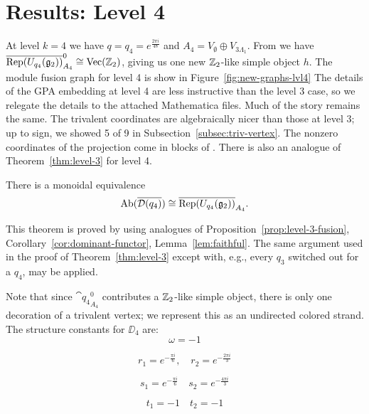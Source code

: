\begin{comment}
    So $B\subseteq A_3$. Since $A_3$ has only two simple summands, we know $A_3$ has no nontrivial subalgebras: $B\cong \unit$ or $B\cong A_3$.
    If $B\cong \unit$ then
    \[
        \Ab(\ol{\DD_3}) \cong \ol{\Rep(U_{q_3}(\gg_2))}_\unit \cong \ol{\Rep(U_{q_3}(\gg_2))}
    \]
    A quick dimension count falsifies this. Hence $\Ab(\ol{\DD_3}) \cong \ol{ \Rep(U_{q_3}(\gg_2))}_{A_3}$.
\end{proof}

\end{comment}






\section{Results: Level 4}\label{sec:results-4}
At level $k=4$ we have $q = q_4 = e^{\frac{2\pi i}{48}}$ and 
$A_4=V_\emptyset \oplus V_{3\Lambda_1}$. 
From \cite{DMNO} we have $\overline{\operatorname{Rep}(U_{q_4}(\mathfrak{g}_2))}_{A_4}^0 \cong \operatorname{Vec}(\mathbb{Z}_2)$, giving us one new 
$\mathbb{Z}_2$-like simple object $h$. 
The module fusion graph for level 4 is show in Figure~\ref{fig:new-graphs-lvl4}
The details of the GPA embedding at level 4 are less instructive than the level 3 case, 
so we relegate the details to the attached Mathematica files. 
Much of the story remains the same. 
The trivalent coordinates are algebraically nicer than those at level 3; 
up to sign, we showed 5 of 9 in Subsection~\ref{subsec:triv-vertex}. 
The nonzero coordinates of the projection come in blocks of . 
There is also an analogue of Theorem~\ref{thm:level-3} for level 4.

\begin{theorem}\label{thm:level-4}
    There is a monoidal equivalence
    \[
        \operatorname{Ab}(\overline{\mathcal{D}(q_4)}) \cong \overline{ \operatorname{Rep}(U_{q_4}(\mathfrak{g}_2))}_{A_4}.
    \]
\end{theorem}

This theorem is proved by using analogues of Proposition~\ref{prop:level-3-fusion}, Corollary~\ref{cor:dominant-functor}, Lemma~\ref{lem:faithful}.
The same argument used in the proof of Theorem~\ref{thm:level-3} except with, e.g., every $q_3$ switched out for a $q_4$, may be applied.

Note that since $\cat{q_4}_{A_4}^0$ contributes a $\mathbb{Z}_2$-like simple object, there is only one decoration of a trivalent vertex;
we represent this as an undirected colored strand.
The structure constants for $\DD_4$ are:
\begin{equation*}
    \omega = -1
\end{equation*}

\begin{equation*}
    r_1 = e^{-\frac{\pi i}{6}}, \quad r_2 = e^{-\frac{2\pi i}{3}}
\end{equation*}

\begin{equation*}
    s_1 = e^{-\frac{\pi i}{6}} \quad s_2 = e^{-\frac{4\pi i}{3}}
\end{equation*}

\begin{equation*}
    t_1 = -1 \quad t_2 = -1
\end{equation*}

